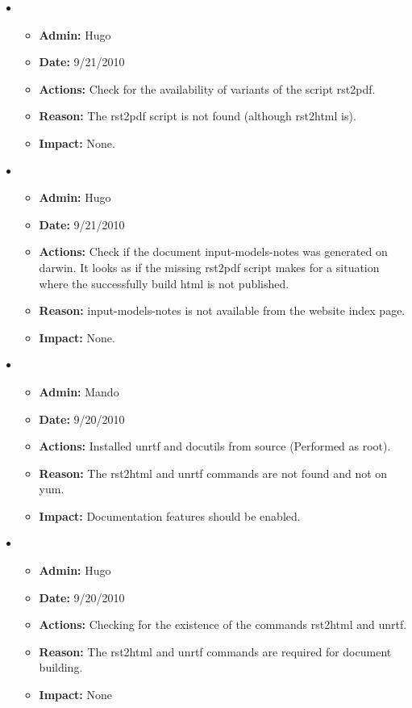 \documentclass[12pt]{article}
\begin{document}
\begin{itemize}

\item 
\begin{itemize}
\item[] {\bf Admin:} Hugo
\item[] {\bf Date:} 9/21/2010 
\item[] {\bf Actions:} Check for the availability of variants of the
  script rst2pdf.
\item[] {\bf Reason:} The rst2pdf script is not found (although
  rst2html is).
\item[] {\bf Impact:} None.
\end{itemize}

\item 
\begin{itemize}
\item[] {\bf Admin:} Hugo
\item[] {\bf Date:} 9/21/2010 
\item[] {\bf Actions:} Check if the document input-models-notes was
  generated on darwin.  It looks as if the missing rst2pdf script
  makes for a situation where the successfully build html is not
  published.
\item[] {\bf Reason:} input-models-notes is not available from the
  website index page.
\item[] {\bf Impact:} None.
\end{itemize}

\item 
\begin{itemize}
\item[] {\bf Admin:} Mando
\item[] {\bf Date:} 9/20/2010 
\item[] {\bf Actions:} Installed unrtf and docutils from source (Performed as root).
\item[] {\bf Reason:} The rst2html and unrtf commands are not found and not on yum.
\item[] {\bf Impact:} Documentation features should be enabled.
\end{itemize}

\item 
\begin{itemize}
\item[] {\bf Admin:} Hugo
\item[] {\bf Date:} 9/20/2010 
\item[] {\bf Actions:} Checking for the existence of the commands
  rst2html and unrtf. 
\item[] {\bf Reason:} The rst2html and unrtf commands are required for
  document building.
\item[] {\bf Impact:} None
\end{itemize}
	

\end{itemize}
\end{document}

